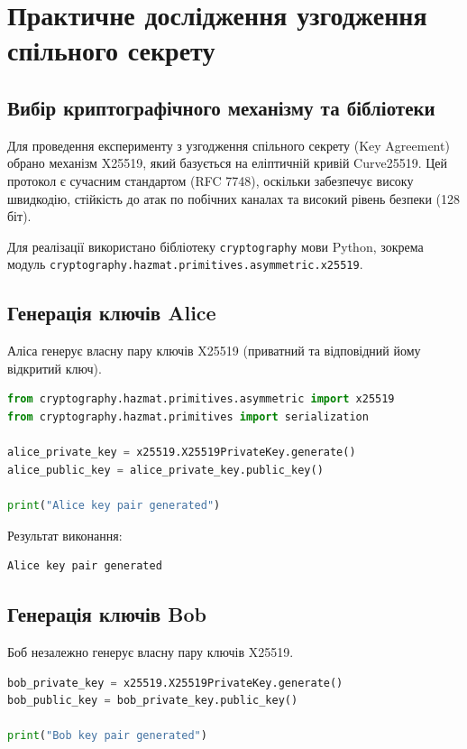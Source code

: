 \section{Практичне дослідження узгодження спільного секрету}

\subsection{Вибір криптографічного механізму та бібліотеки}
Для проведення експерименту з узгодження спільного секрету (Key Agreement) обрано механізм X25519, який базується на еліптичній кривій Curve25519. Цей протокол є сучасним стандартом (RFC 7748), оскільки забезпечує високу швидкодію, стійкість до атак по побічних каналах та високий рівень безпеки (128 біт). 

Для реалізації використано бібліотеку \texttt{cryptography} мови Python, зокрема модуль \texttt{cryptography.hazmat.primitives.asymmetric.x25519}.

\subsection{Генерація ключів Alice}
Аліса генерує власну пару ключів X25519 (приватний та відповідний йому відкритий ключ).

\begin{lstlisting}[language=Python]
from cryptography.hazmat.primitives.asymmetric import x25519
from cryptography.hazmat.primitives import serialization

alice_private_key = x25519.X25519PrivateKey.generate()
alice_public_key = alice_private_key.public_key()

print("Alice key pair generated")
\end{lstlisting}

Результат виконання:
\begin{lstlisting}
Alice key pair generated
\end{lstlisting}

\subsection{Генерація ключів Bob}
Боб незалежно генерує власну пару ключів X25519.

\begin{lstlisting}[language=Python]
bob_private_key = x25519.X25519PrivateKey.generate()
bob_public_key = bob_private_key.public_key()

print("Bob key pair generated")
\end{lstlisting}

